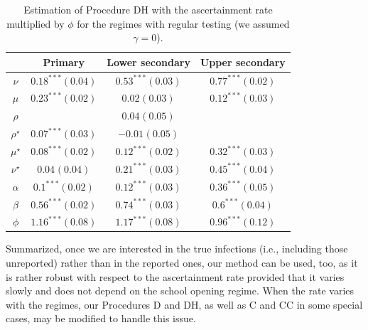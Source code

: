 \documentclass[fleqn,10pt]{wlscirep}
\begin{document}
\begin{table}
\begin{center}

\begin{tabular}{c|ccc} &  Primary & Lower secondary & Upper secondary \\ \hline 						
	$\nu$		& $0.18^{***}(0.04)$	& $0.53^{***}(0.03)$	& $0.77^{***}(0.02)$	\\
	$\mu$		& $0.23^{***}(0.02)$	& $0.02^{}(0.03)$	& $0.12^{***}(0.03)$	\\
	$\rho$		&	& $0.04^{}(0.05)$	&	\\
	$\rho^\star$		& $0.07^{***}(0.03)$	& $-0.01^{}(0.05)$	&	\\
	$\mu^\star$		& $0.08^{***}(0.02)$	& $0.12^{***}(0.02)$	& $0.32^{***}(0.03)$	\\
	$\nu^\star$		& $0.04^{}(0.04)$	& $0.21^{***}(0.03)$	& $0.45^{***}(0.04)$	\\ \hline
	$\alpha$		& $0.1^{***}(0.02)$	& $0.12^{***}(0.03)$	& $0.36^{***}(0.05)$	\\
	$\beta$		& $0.56^{***}(0.02)$	& $0.74^{***}(0.03)$	& $0.6^{***}(0.04)$	\\ \hline
	$\phi$		& $1.16^{***}(0.08)$	& $1.17^{***}(0.08)$	& $0.96^{***}(0.12)$	\\
\end{tabular}						
\caption{Estimation of Procedure DH with the ascertainment rate multiplied by $\phi$ for the regimes with regular testing (we assumed $\gamma=0$).}
\label{tab:dhstar}
\end{center}
\end{table}


Summarized, once we are interested in the true infections (i.e., including those unreported) rather than in the reported ones, our method can be used, too, as it is rather robust with respect to the ascertainment rate provided that it varies slowly and does not depend on the school opening regime. When the rate varies with the regimes, our Procedures D and DH, as well as C and CC in some special cases, may be modified to handle this issue.
\end{document}
